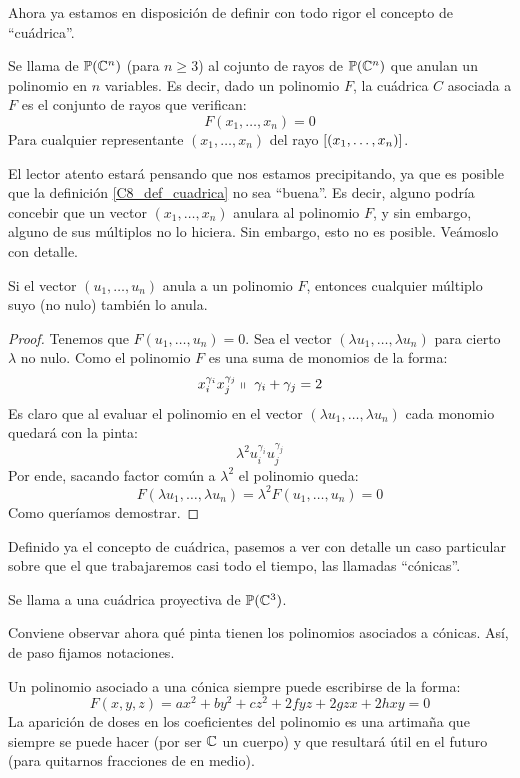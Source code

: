 Ahora ya estamos en disposición de definir con todo rigor el concepto de ``cuádrica''.
\begin{defi}[Cuádrica]
	\label{C8_def_cuadrica}
	Se llama  de $\mathbb{P}(\mathbb{C}^n)$ (para $n\geq 3$) al cojunto de rayos de $\mathbb{P}(\mathbb{C}^n)$ que anulan un polinomio en $n$ variables. Es decir, dado un polinomio $F$, la cuádrica $C$ asociada a $F$ es el conjunto de rayos que verifican:
	\[F(x_1,\dots,x_n)=0\]
	Para cualquier representante $(x_1,\dots,x_n)$ del rayo $\left [ (x_1,\dots,x_n) \right ]$.
\end{defi}
El lector atento estará pensando que nos estamos precipitando, ya que es posible que la definición \ref{C8_def_cuadrica} no sea ``buena''. Es decir, alguno podría concebir que un vector $(x_1,\dots,x_n)$ anulara al polinomio $F$, y sin embargo, alguno de sus múltiplos no lo hiciera. Sin embargo, esto no es posible. Veámoslo con detalle.
\begin{lem}
	Si el vector $(u_1,\dots,u_n)$ anula a un polinomio $F$, entonces cualquier múltiplo suyo (no nulo) también lo anula.
\end{lem}
\begin{proof}
	Tenemos que $F(u_1,\dots,u_n)=0$. Sea el vector $(\lambda u_1,\dots, \lambda u_n)$ para cierto $\lambda$ no nulo. Como el polinomio $F$ es una suma de monomios de la forma:
	\[x_i^{\gamma_i}x_j^{\gamma_j}\tq\ \gamma_i+\gamma_j=2\]
	Es claro que al evaluar el polinomio en el vector $(\lambda u_1,\dots, \lambda u_n)$ cada monomio quedará con la pinta:
	\[\lambda^2u_i^{\gamma_i}u_j^{\gamma_j}\]
	Por ende, sacando factor común a $\lambda^2$ el polinomio queda:
	\[F(\lambda u_1,\dots, \lambda u_n)=\lambda^2F(u_1,\dots,u_n)=0\]
	Como queríamos demostrar.
\end{proof}

Definido ya el concepto de cuádrica, pasemos a ver con detalle un caso particular sobre que el que trabajaremos casi todo el tiempo, las llamadas ``cónicas''.
\begin{defi}[Cónica]
	Se llama  a una cuádrica proyectiva de $\mathbb{P}(\mathbb{C}^3)$.
\end{defi}
Conviene observar ahora qué pinta tienen los polinomios asociados a cónicas. Así, de paso fijamos notaciones.

Un polinomio asociado a una cónica siempre puede escribirse de la forma:
\begin{equation}
	\label{C8_eq_polinomios1}
	F(x,y,z)=ax^2+by^2+cz^2+2fyz+2gzx+2hxy=0
\end{equation}
La aparición de doses en los coeficientes del polinomio es una artimaña que siempre se puede hacer (por ser $\mathbb{C}$ un cuerpo) y que resultará útil en el futuro (para quitarnos fracciones de en medio). 
